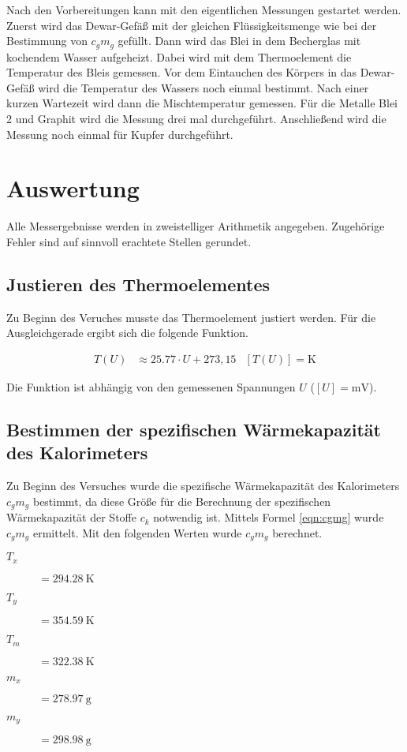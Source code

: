 Nach den Vorbereitungen kann mit den eigentlichen Messungen gestartet werden.
Zuerst wird das Dewar-Gefäß mit der gleichen Flüssigkeitsmenge wie bei der
Bestimmung von $c_g m_g$ gefüllt. Dann wird das Blei in dem Becherglas mit kochendem
Wasser aufgeheizt. Dabei wird mit dem Thermoelement die Temperatur des Bleis
gemessen. Vor dem Eintauchen des Körpers in das Dewar-Gefäß wird die
Temperatur des Wassers noch einmal bestimmt. Nach einer kurzen Wartezeit wird
dann die Mischtemperatur gemessen.
Für die Metalle Blei 2 und Graphit wird die Messung drei mal durchgeführt.
Anschließend wird die Messung noch einmal für Kupfer durchgeführt.

\section{Auswertung}

Alle Messergebnisse werden in zweistelliger Arithmetik angegeben. Zugehörige
Fehler sind auf sinnvoll erachtete Stellen gerundet.

\subsection{Justieren des Thermoelementes}
Zu Beginn des Veruches musste das Thermoelement justiert werden. Für die
Ausgleichgerade ergibt sich die folgende Funktion.

\begin{align*}
  T(U) &\approx 25.77 \cdot U + 273,15 & [T(U)] = \si{\kelvin}
\end{align*}

Die Funktion ist abhängig von den gemessenen Spannungen $U$ ($[U] = \si{\milli\volt}$).

\subsection{Bestimmen der spezifischen Wärmekapazität des Kalorimeters}

Zu Beginn des Versuches wurde die spezifische Wärmekapazität des Kalorimeters
$c_gm_g$ bestimmt, da diese Größe für die Berechnung der spezifischen
Wärmekapazität der Stoffe $c_k$ notwendig ist. Mittels Formel \eqref{eqn:cgmg} wurde
$c_gm_g$ ermittelt. Mit den folgenden Werten wurde $c_gm_g$ berechnet.

\begin{description}
  \item[$T_x$]$ = \SI{294,28}{\kelvin}$
  \item[$T_y$]$ = \SI{354,59}{\kelvin}$
  \item[$T_m$]$ = \SI{322,38}{\kelvin}$
  \item[$m_x$]$ = \SI{278,97}{\gram}$
  \item[$m_y$]$ = \SI{298,98}{\gram}$
\end{description}

